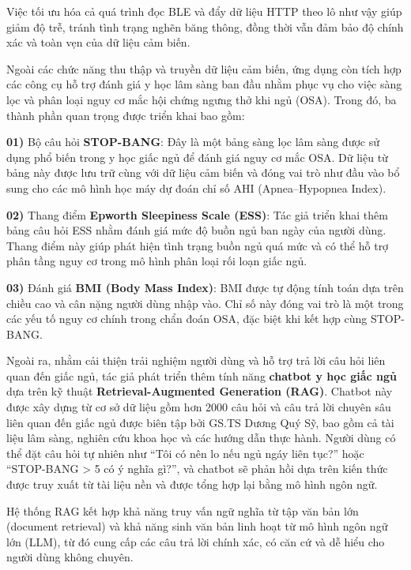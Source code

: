 Việc tối ưu hóa cả quá trình đọc BLE và đẩy dữ liệu HTTP theo lô 
như vậy giúp giảm độ trễ, tránh tình trạng nghẽn băng thông, đồng thời 
vẫn đảm bảo độ chính xác và toàn vẹn của dữ liệu cảm biến.


Ngoài các chức năng thu thập và truyền dữ liệu cảm biến, ứng dụng còn tích hợp 
các công cụ hỗ trợ đánh giá y học lâm sàng ban đầu nhằm phục vụ cho việc sàng 
lọc và phân loại nguy cơ mắc hội chứng ngưng thở khi ngủ (OSA). Trong đó, 
ba thành phần quan trọng được triển khai bao gồm:

\noindent\textbf{01)} Bộ câu hỏi \textbf{STOP-BANG}: Đây là một bảng sàng lọc lâm sàng được sử dụng phổ biến trong y học giấc ngủ để đánh giá nguy cơ mắc OSA. Dữ liệu từ bảng này được lưu trữ cùng với dữ liệu cảm biến và đóng vai trò như đầu vào bổ sung cho các mô hình học máy dự đoán chỉ số AHI (Apnea–Hypopnea Index).

\vspace{0.5em}
\noindent\textbf{02)} Thang điểm \textbf{Epworth Sleepiness Scale (ESS)}: Tác giả triển khai thêm bảng câu hỏi ESS nhằm đánh giá mức độ buồn ngủ ban ngày của người dùng. Thang điểm này giúp phát hiện tình trạng buồn ngủ quá mức và có thể hỗ trợ phân tầng nguy cơ trong mô hình phân loại rối loạn giấc ngủ.

\vspace{0.5em}
\noindent\textbf{03)} Đánh giá \textbf{BMI (Body Mass Index)}: BMI được tự động tính toán dựa trên chiều cao và cân nặng người dùng nhập vào. Chỉ số này đóng vai trò là một trong các yếu tố nguy cơ chính trong chẩn đoán OSA, đặc biệt khi kết hợp cùng STOP-BANG.


Ngoài ra, nhằm cải thiện trải nghiệm người dùng và hỗ trợ trả lời câu hỏi liên quan 
đến giấc ngủ, tác giả 
phát triển thêm tính năng \textbf{chatbot y học giấc ngủ} dựa trên kỹ thuật 
\textbf{Retrieval-Augmented Generation (RAG)}. Chatbot này được xây dựng từ cơ 
sở dữ liệu gồm hơn 2000 câu hỏi và 
câu trả lời chuyên sâu liên quan đến giấc ngủ được biên tập bởi GS.TS Dương Quý Sỹ, 
bao gồm cả tài liệu lâm sàng, nghiên cứu khoa học và các hướng dẫn thực hành. 
Người dùng có thể đặt câu hỏi tự nhiên như “Tôi có nên lo nếu ngủ ngáy liên tục?” 
hoặc “STOP-BANG > 5 có ý nghĩa gì?”, và chatbot sẽ phản hồi dựa trên kiến 
thức được truy xuất từ tài liệu nền và được tổng hợp lại bằng mô hình ngôn ngữ.

Hệ thống RAG kết hợp khả năng truy vấn ngữ nghĩa từ tập văn bản lớn 
(document retrieval) và khả năng sinh văn bản linh hoạt từ mô hình ngôn ngữ lớn 
(LLM), từ đó cung cấp các câu trả lời chính xác, có căn cứ và dễ hiểu cho 
người dùng không chuyên.

